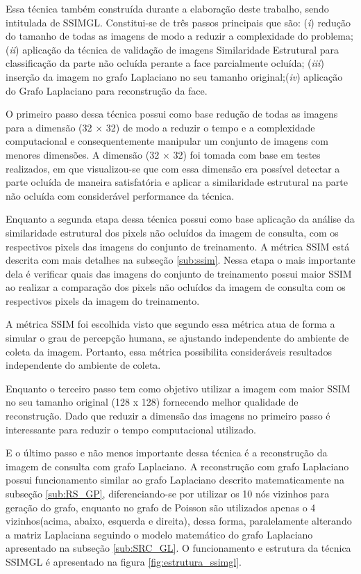 Essa técnica também construída durante a elaboração deste trabalho, sendo intitulada de SSIMGL. Constitui-se de três passos principais que são: (\textit{i}) redução do tamanho de todas as imagens de modo a reduzir a complexidade do problema; (\textit{ii}) aplicação da técnica de validação de imagens Similaridade Estrutural para classificação da parte não ocluída perante a face parcialmente ocluída; (\textit{iii}) inserção da imagem no grafo Laplaciano no seu tamanho original;(\textit{iv}) aplicação do Grafo Laplaciano para reconstrução da face. 


O primeiro passo dessa técnica possui como base  redução de todas as imagens para a dimensão (32 $\times$ 32) de modo a reduzir o tempo e a complexidade computacional e consequentemente manipular um conjunto de imagens com  menores dimensões. A dimensão (32 $\times$ 32) foi tomada com base em testes realizados, em que visualizou-se que com essa dimensão era possível detectar a parte ocluída de maneira satisfatória e aplicar a similaridade estrutural na parte não ocluída com considerável performance da técnica.

Enquanto a segunda etapa dessa técnica possui como base aplicação da análise da similaridade estrutural \cite{ssim2004} dos pixels não ocluídos da imagem de consulta, com os respectivos pixels das imagens do conjunto de treinamento. A métrica SSIM está descrita com mais detalhes na subseção \ref{sub:ssim}. Nessa etapa o mais importante dela é verificar quais das imagens do conjunto de treinamento possui maior SSIM ao realizar a comparação dos pixels não ocluídos da imagem de consulta com os respectivos pixels da imagem do treinamento.
	


 A métrica SSIM foi escolhida visto que  segundo  essa métrica atua de forma a simular o grau de percepção humana, se ajustando independente do ambiente de coleta da imagem. Portanto, essa métrica possibilita consideráveis resultados independente do ambiente de coleta. 
 
Enquanto o terceiro passo tem como objetivo utilizar a imagem com maior SSIM no seu tamanho original (128 x 128) fornecendo melhor qualidade de reconstrução. Dado que reduzir a dimensão das imagens no primeiro passo é interessante para reduzir o tempo computacional utilizado.

E o último passo e não menos importante dessa técnica é a reconstrução da imagem de consulta com grafo Laplaciano. A reconstrução com grafo Laplaciano possui funcionamento similar ao grafo Laplaciano descrito matematicamente na subseção \ref{sub:RS_GP}, diferenciando-se por utilizar os 10 nós vizinhos para geração do grafo, enquanto no grafo de Poisson são utilizados apenas o 4 vizinhos(acima, abaixo, esquerda e direita), dessa forma, paralelamente alterando a matriz Laplaciana seguindo o modelo matemático do grafo Laplaciano apresentado na subseção \ref{sub:SRC_GL}. O funcionamento e estrutura da técnica SSIMGL é apresentado na figura \ref{fig:estrutura_ssimgl}.



